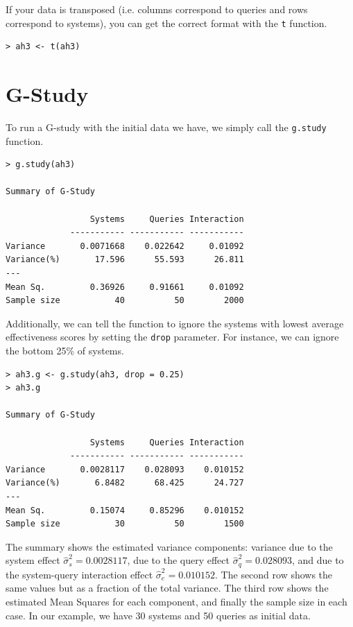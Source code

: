 \documentclass[twoside]{article}
\begin{document}
If your data is transposed (i.e. columns correspond to queries and rows correspond to systems), you can get the correct format with the \texttt{t} function.

{\small\begin{verbatim}
> ah3 <- t(ah3)
\end{verbatim}}

\section{G-Study}

To run a G-study with the initial data we have, we simply call the \texttt{g.study} function.

{\small\begin{verbatim}
> g.study(ah3)

Summary of G-Study

                 Systems     Queries Interaction
             ----------- ----------- -----------
Variance       0.0071668    0.022642     0.01092
Variance(%)       17.596      55.593      26.811
---
Mean Sq.         0.36926     0.91661     0.01092
Sample size           40          50        2000
\end{verbatim}}

Additionally, we can tell the function to ignore the systems with lowest average effectiveness scores by setting the \texttt{drop} parameter. For instance, we can ignore the bottom 25\% of systems.

{\small\begin{verbatim}
> ah3.g <- g.study(ah3, drop = 0.25)
> ah3.g

Summary of G-Study

                 Systems     Queries Interaction
             ----------- ----------- -----------
Variance       0.0028117    0.028093    0.010152
Variance(%)       6.8482      68.425      24.727
---
Mean Sq.         0.15074     0.85296    0.010152
Sample size           30          50        1500
\end{verbatim}}

The summary shows the estimated variance components: variance due to the system effect $\hat\sigma_s^2=0.0028117$, due to the query effect $\hat\sigma_q^2=0.028093$, and due to the system-query interaction effect $\hat\sigma_e^2=0.010152$.
The second row shows the same values but as a fraction of the total variance. The third row shows the estimated Mean Squares for each component, and finally the sample size in each case. In our example, we have 30 systems and 50 queries as initial data.
\end{document}
